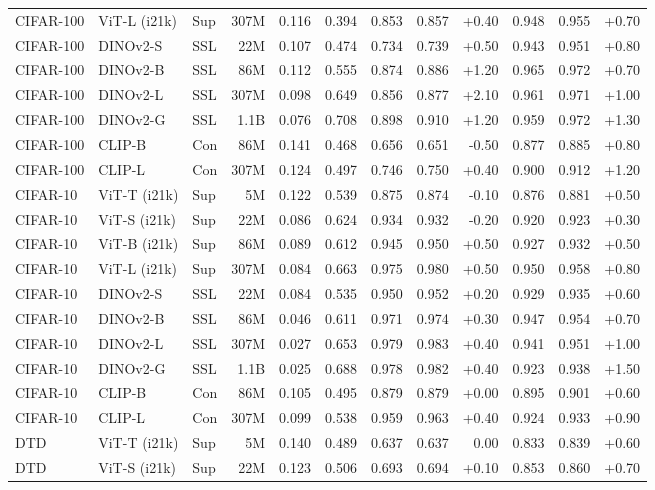 \begin{table}[!htbp]
\begin{tabular}{lllrrr|rrr|rrr}
CIFAR-100 & ViT-L (i21k) & Sup & 307M & 0.116 & 0.394 & 0.853 & 0.857 & +0.40 & 0.948 & 0.955 & +0.70 \\
CIFAR-100 & DINOv2-S & SSL & 22M & 0.107 & 0.474 & 0.734 & 0.739 & +0.50 & 0.943 & 0.951 & +0.80 \\
CIFAR-100 & DINOv2-B & SSL & 86M & 0.112 & 0.555 & 0.874 & 0.886 & +1.20 & 0.965 & 0.972 & +0.70 \\
CIFAR-100 & DINOv2-L & SSL & 307M & 0.098 & 0.649 & 0.856 & 0.877 & +2.10 & 0.961 & 0.971 & +1.00 \\
CIFAR-100 & DINOv2-G & SSL & 1.1B & 0.076 & 0.708 & 0.898 & 0.910 & +1.20 & 0.959 & 0.972 & +1.30 \\
CIFAR-100 & CLIP-B & Con & 86M & 0.141 & 0.468 & 0.656 & 0.651 & -0.50 & 0.877 & 0.885 & +0.80 \\
CIFAR-100 & CLIP-L & Con & 307M & 0.124 & 0.497 & 0.746 & 0.750 & +0.40 & 0.900 & 0.912 & +1.20 \\
\midrule
CIFAR-10 & ViT-T (i21k) & Sup & 5M & 0.122 & 0.539 & 0.875 & 0.874 & -0.10 & 0.876 & 0.881 & +0.50 \\
CIFAR-10 & ViT-S (i21k) & Sup & 22M & 0.086 & 0.624 & 0.934 & 0.932 & -0.20 & 0.920 & 0.923 & +0.30 \\
CIFAR-10 & ViT-B (i21k) & Sup & 86M & 0.089 & 0.612 & 0.945 & 0.950 & +0.50 & 0.927 & 0.932 & +0.50 \\
CIFAR-10 & ViT-L (i21k) & Sup & 307M & 0.084 & 0.663 & 0.975 & 0.980 & +0.50 & 0.950 & 0.958 & +0.80 \\
CIFAR-10 & DINOv2-S & SSL & 22M & 0.084 & 0.535 & 0.950 & 0.952 & +0.20 & 0.929 & 0.935 & +0.60 \\
CIFAR-10 & DINOv2-B & SSL & 86M & 0.046 & 0.611 & 0.971 & 0.974 & +0.30 & 0.947 & 0.954 & +0.70 \\
CIFAR-10 & DINOv2-L & SSL & 307M & 0.027 & 0.653 & 0.979 & 0.983 & +0.40 & 0.941 & 0.951 & +1.00 \\
CIFAR-10 & DINOv2-G & SSL & 1.1B & 0.025 & 0.688 & 0.978 & 0.982 & +0.40 & 0.923 & 0.938 & +1.50 \\
CIFAR-10 & CLIP-B & Con & 86M & 0.105 & 0.495 & 0.879 & 0.879 & +0.00 & 0.895 & 0.901 & +0.60 \\
CIFAR-10 & CLIP-L & Con & 307M & 0.099 & 0.538 & 0.959 & 0.963 & +0.40 & 0.924 & 0.933 & +0.90 \\
\midrule
DTD & ViT-T (i21k) & Sup & 5M & 0.140 & 0.489 & 0.637 & 0.637 & 0.00 & 0.833 & 0.839 & +0.60 \\
DTD & ViT-S (i21k) & Sup & 22M & 0.123 & 0.506 & 0.693 & 0.694 & +0.10 & 0.853 & 0.860 & +0.70 \\

\end{tabular}
\end{table}
